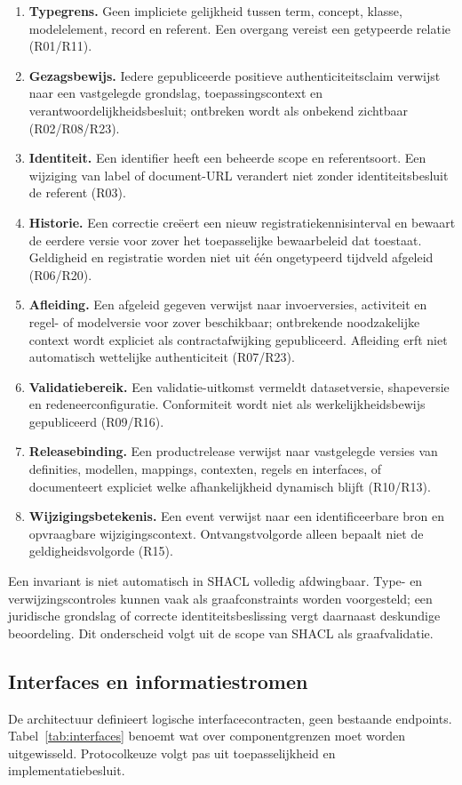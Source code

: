 \begin{enumerate}[label=I\arabic*.,leftmargin=1cm]
\item \textbf{Typegrens.} Geen impliciete gelijkheid tussen term, concept, klasse, modelelement, record en referent. Een overgang vereist een getypeerde relatie (R01/R11).
\item \textbf{Gezagsbewijs.} Iedere gepubliceerde positieve authenticiteitsclaim verwijst naar een vastgelegde grondslag, toepassingscontext en verantwoordelijkheidsbesluit; ontbreken wordt als onbekend zichtbaar (R02/R08/R23).
\item \textbf{Identiteit.} Een identifier heeft een beheerde scope en referentsoort. Een wijziging van label of document-URL verandert niet zonder identiteitsbesluit de referent (R03).
\item \textbf{Historie.} Een correctie creëert een nieuw registratiekennisinterval en bewaart de eerdere versie voor zover het toepasselijke bewaarbeleid dat toestaat. Geldigheid en registratie worden niet uit één ongetypeerd tijdveld afgeleid (R06/R20).
\item \textbf{Afleiding.} Een afgeleid gegeven verwijst naar invoerversies, activiteit en regel- of modelversie voor zover beschikbaar; ontbrekende noodzakelijke context wordt expliciet als contractafwijking gepubliceerd. Afleiding erft niet automatisch wettelijke authenticiteit (R07/R23).
\item \textbf{Validatiebereik.} Een validatie-uitkomst vermeldt datasetversie, shapeversie en redeneerconfiguratie. Conformiteit wordt niet als werkelijkheidsbewijs gepubliceerd (R09/R16).
\item \textbf{Releasebinding.} Een productrelease verwijst naar vastgelegde versies van definities, modellen, mappings, contexten, regels en interfaces, of documenteert expliciet welke afhankelijkheid dynamisch blijft (R10/R13).
\item \textbf{Wijzigingsbetekenis.} Een event verwijst naar een identificeerbare bron en opvraagbare wijzigingscontext. Ontvangstvolgorde alleen bepaalt niet de geldigheidsvolgorde (R15).
\end{enumerate}
Een invariant is niet automatisch in SHACL volledig afdwingbaar. Type- en verwijzingscontroles kunnen vaak als graafconstraints worden voorgesteld; een juridische grondslag of correcte identiteitsbeslissing vergt daarnaast deskundige beoordeling. Dit onderscheid volgt uit de scope van SHACL als graafvalidatie. \citep{S32}

\subsection{Interfaces en informatiestromen}
De architectuur definieert logische interfacecontracten, geen bestaande endpoints. Tabel~\ref{tab:interfaces} benoemt wat over componentgrenzen moet worden uitgewisseld. Protocolkeuze volgt pas uit toepasselijkheid en implementatiebesluit.

